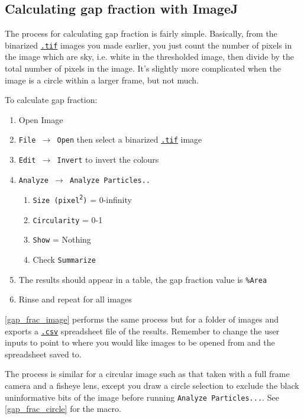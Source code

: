 \documentclass{article}
\newcommand\menu[1]{\texttt{\color{blue}#1}}
\newcommand\file[1]{\texttt{\underline{#1}}}
\begin{document}
\subsection{Calculating gap fraction with ImageJ}

The process for calculating gap fraction is fairly simple. Basically, from the binarized \file{.tif} images you made earlier, you just count the number of pixels in the image which are sky, i.e. white in the thresholded image, then divide by the total number of pixels in the image. It's slightly more complicated when the image is a circle within a larger frame, but not much.

To calculate gap fraction: 

\begin{enumerate}
	\item{Open Image}
	\item{\menu{File $\rightarrow$ Open} then select a binarized \file{.tif} image} 
	\item{\menu{Edit $\rightarrow$ Invert} to invert the colours}
	\item{\menu{Analyze $\rightarrow$ Analyze Particles..}}
		\begin{enumerate}
			\item{\menu{Size (pixel\textsuperscript{2})} = 0-infinity}
			\item{\menu{Circularity} = 0-1}
			\item{\menu{Show} = Nothing}
			\item{Check \menu{Summarize}}
		\end{enumerate}
	\item{The results should appear in a table, the gap fraction value is \menu{\%Area}}
	\item{Rinse and repeat for all images}
\end{enumerate}

\autoref{gap_frac_image} performs the same process but for a folder of images and exports a \file{.csv} spreadsheet file of the results. Remember to change the user inputs to point to where you would like images to be opened from and the spreadsheet saved to.

\begin{minipage}{\linewidth}

\end{minipage}

The process is similar for a circular image such as that taken with a full frame camera and a fisheye lens, except you draw a circle selection to exclude the black uninformative bits of the image before running \menu{Analyze Particles...}. See \autoref{gap_frac_circle} for the macro. 
\end{document}
